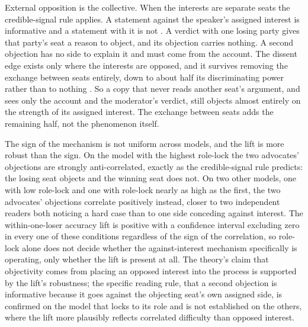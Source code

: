External opposition is the collective. When the interests are separate
seats the credible-signal rule applies. A statement against the speaker's
assigned interest is informative and a statement with it is not
\citep{milgrom1986relying,lipman1995robust,glazer2001debates}. A verdict
with one losing party gives that party's seat a reason to object, and its
objection carries nothing. A second objection has no side to explain it
and must come from the account. The dissent edge exists only where the
interests are opposed, and it survives removing the exchange between
seats entirely, down to about half its discriminating power rather than
to nothing
\citep{dewatripont1999advocates,krishna2001model}.
So a copy that never reads another seat's argument, and sees only the
account and the moderator's verdict, still objects almost entirely on the
strength of its assigned interest. The exchange between seats adds the
remaining half, not the phenomenon itself.

The sign of the mechanism is not uniform across models, and the lift is
more robust than the sign. On the model with the highest role-lock the two
advocates' objections are strongly anti-correlated, exactly as the
credible-signal rule predicts: the losing seat objects and the winning
seat does not. On two other models, one with low role-lock and one with
role-lock nearly as high as the first, the two advocates' objections
correlate positively instead, closer to two independent readers both
noticing a hard case than to one side conceding against interest.
The within-one-loser accuracy lift is positive with a confidence interval
excluding zero in every one of these conditions regardless of the sign of
the correlation, so role-lock alone does not decide whether the
against-interest mechanism specifically is operating, only whether the
lift is present at all. The theory's claim that objectivity comes from
placing an opposed interest into the process is supported by the lift's
robustness; the specific reading rule, that a second objection is
informative because it goes against the objecting seat's own assigned
side, is confirmed on the model that locks to its role and is not
established on the others, where the lift more plausibly reflects
correlated difficulty than opposed interest.

